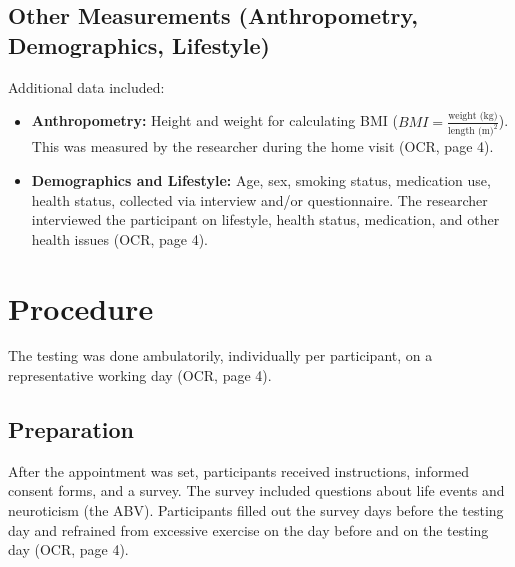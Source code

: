 \documentclass[11pt, a4paper]{report}
\begin{document}
\subsection{Other Measurements (Anthropometry, Demographics, Lifestyle)}
\label{subsec:measurement_other} %
Additional data included:
\begin{itemize}
    \item\textbf{Anthropometry:} Height and weight for calculating BMI ($BMI = \frac{\text{weight (kg)}}{\text{length (m)}^2}$). This was measured by the researcher during the home visit \cite{ThesisTempPDF} (OCR, page 4).
    \item\textbf{Demographics and Lifestyle:} Age, sex, smoking status, medication use, health status, collected via interview and/or questionnaire. The researcher interviewed the participant on lifestyle, health status, medication, and other health issues \cite{ThesisTempPDF} (OCR, page 4).
\end{itemize}

\section{Procedure}
\label{sec:procedure_method} %

The testing was done ambulatorily, individually per participant, on a representative working day \cite{ThesisTempPDF} (OCR, page 4).

\subsection{Preparation}
\label{subsec:proc_preparation} %
After the appointment was set, participants received instructions, informed consent forms, and a survey. The survey included questions about life events and neuroticism (the ABV). Participants filled out the survey days before the testing day and refrained from excessive exercise on the day before and on the testing day \cite{ThesisTempPDF} (OCR, page 4).
\end{document}

